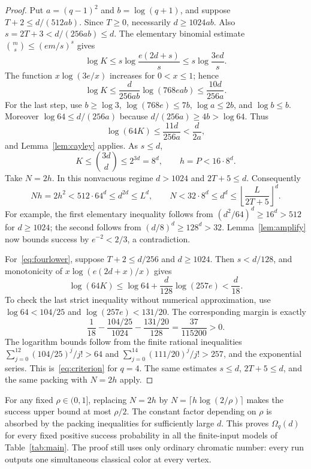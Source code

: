 \documentclass[11pt]{article}
\theoremstyle{definition}\newtheorem{definition}[theorem]{Definition}
\theoremstyle{remark}\newtheorem{remark}[theorem]{Remark}
\begin{document}
\begin{proof}
Put $a=(q-1)^2$ and $b=\log(q+1)$, and suppose
$T+2\le d/(512ab)$. Since $T\ge0$, necessarily $d\ge1024ab$.
Also $s=2T+3<d/(256ab)\le d$. The elementary binomial estimate
$\binom{m}{s}\le(em/s)^s$ gives
\[
 \log K\le s\log\frac{e(2d+s)}s
             \le s\log\frac{3ed}s.
\]
The function $x\log(3e/x)$ increases for $0<x\le1$; hence
\[
 \log K\le\frac{d}{256ab}\log(768eab)
             \le\frac{10d}{256a}.
\]
For the last step, use $b\ge\log3$, $\log(768e)\le7b$,
$\log a\le2b$, and $\log b\le b$.
Moreover $\log64\le d/(256a)$ because $d/(256a)\ge4b>\log64$.
Thus
\[
                    \log(64K)\le\frac{11d}{256a}<\frac{d}{2a},
\]
and Lemma~\ref{lem:cayley} applies. As $s\le d$,
\[
                     K\le\binom{3d}{d}\le2^{3d}=8^d,
                     \qquad h=P<16\cdot8^d.
\]
Take $N=2h$. In this nonvacuous regime $d>1024$ and
$2T+5\le d$. Consequently
\[
 Nh=2h^2<512\cdot64^d\le d^{2d}\le L^d,
 \qquad
 N<32\cdot8^d\le d^d\le
       \left\lfloor\frac{L}{2T+5}\right\rfloor^d.
\]
For example, the first elementary inequality follows from
$(d^2/64)^d\ge16^d>512$ for $d\ge1024$; the second follows from
$(d/8)^d\ge128^d>32$. Lemma~\ref{lem:amplify} now bounds success
by $e^{-2}<2/3$, a contradiction.

For~\eqref{eq:fourlower}, suppose $T+2\le d/256$ and $d\ge1024$.
Then $s<d/128$, and monotonicity of
$x\log(e(2d+x)/x)$ gives
\[
 \log(64K)\le\log64+\frac{d}{128}\log(257e)<\frac d{18}.
\]
To check the last strict inequality without numerical approximation,
use $\log64<104/25$ and $\log(257e)<131/20$. The corresponding
margin is exactly
\[
 \frac1{18}-\frac{104/25}{1024}-\frac{131/20}{128}
                         =\frac{37}{115200}>0.
\]
The logarithm bounds follow from the finite rational inequalities
$\sum_{j=0}^{12}(104/25)^j/j!>64$ and
$\sum_{j=0}^{14}(111/20)^j/j!>257$, and the exponential series.
This is~\eqref{eq:criterion} for $q=4$. The same estimates
$s\le d$, $2T+5\le d$, and the same packing with $N=2h$ apply.
\end{proof}

For any fixed $\rho\in(0,1]$, replacing $N=2h$ by
$N=\lceil h\log(2/\rho)\rceil$ makes the success upper bound at most
$\rho/2$. The constant factor depending on $\rho$ is absorbed by
the packing inequalities for sufficiently large $d$. This proves
$\Omega_q(d)$ for every fixed positive success probability in all
the finite-input models of Table~\ref{tab:main}. The proof still
uses only ordinary chromatic number: every run outputs one
simultaneous classical color at every vertex.
\end{document}
